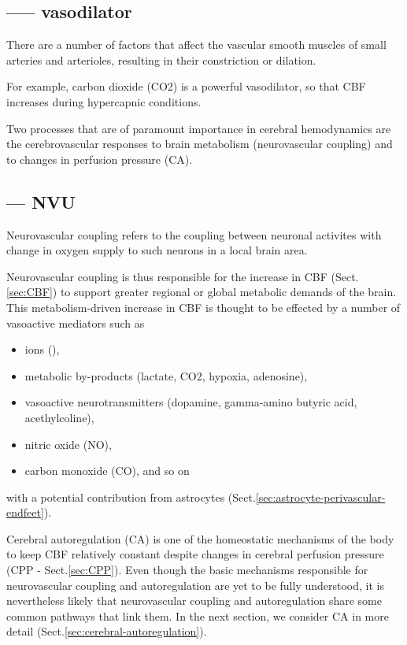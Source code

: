 \subsection{----- vasodilator}


There are a number of factors that affect the vascular smooth muscles of small
arteries and arterioles, resulting in their constriction or dilation. 

For example, carbon dioxide (CO2) is a powerful vasodilator, so that CBF
increases during hypercapnic conditions. 

Two processes that are of paramount importance in cerebral hemodynamics are the
cerebrovascular responses to brain metabolism (neurovascular coupling) and to
changes in perfusion pressure (CA).


\subsection{--- NVU}
\label{sec:NVU}

Neurovascular coupling refers to the coupling between neuronal activites with
change in oxygen supply to such neurons in a local brain area.

Neurovascular coupling is thus responsible for the increase in CBF
(Sect.\ref{sec:CBF}) to support greater regional or global metabolic demands of
the brain. This metabolism-driven increase in CBF is thought to be effected by a
number of vasoactive mediators such as
\begin{itemize}
  \item ions (), 
  
  \item metabolic by-products (lactate, CO2, hypoxia, adenosine), 
  
  \item vasoactive neurotransmitters (dopamine, gamma-amino butyric acid,
  acethylcoline), 
  
  \item nitric oxide (NO), 
  
  \item carbon monoxide (CO), and so on
\end{itemize}
with a potential contribution from astrocytes
(Sect.\ref{sec:astrocyte-perivascular-endfeet}).

Cerebral autoregulation (CA) is one of the homeostatic mechanisms of the body to
keep CBF relatively constant despite changes in cerebral perfusion pressure (CPP
- Sect.\ref{sec:CPP}). Even though the basic mechanisms responsible for
neurovascular coupling and autoregulation are yet to be fully understood, it is
nevertheless likely that neurovascular coupling and autoregulation share some
common pathways that link them. In the next section, we consider CA in more
detail (Sect.\ref{sec:cerebral-autoregulation}).


